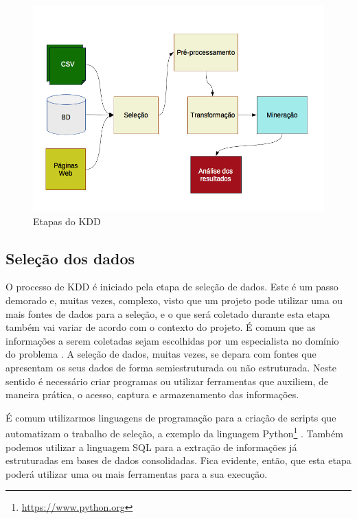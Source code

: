 \begin{figure}[htb]
  \caption{\label{fig:kdd}Etapas do KDD}
  \begin{center}
    \includegraphics[scale=0.8]{imagens/kdd.png}
  \end{center}
\end{figure}
\newpage

\subsection{Seleção dos dados}

O processo de KDD é iniciado pela etapa de seleção de dados. Este é um passo demorado e, muitas vezes, complexo, visto que um projeto pode utilizar uma ou mais fontes de dados para a seleção, e o que será coletado durante esta etapa também vai variar de acordo com o contexto do projeto. É comum que as informações a serem coletadas sejam escolhidas por um especialista no domínio do problema \cite{Boente2008}. A seleção de dados, muitas vezes, se depara com fontes que apresentam os seus dados de forma semiestruturada ou não estruturada. Neste sentido é necessário criar programas ou utilizar ferramentas que auxiliem, de maneira prática, o acesso, captura e armazenamento das informações.

É comum utilizarmos linguagens de programação para a criação de scripts que automatizam o trabalho de seleção, a exemplo da linguagem Python\footnote{\url{https://www.python.org}} \cite{Smedt2012}. Também podemos utilizar a linguagem SQL para a extração de informações já estruturadas em bases de dados consolidadas. Fica evidente, então, que esta etapa poderá utilizar uma ou mais ferramentas para a sua execução.

